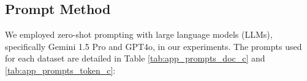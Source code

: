 \documentclass[11pt]{article}
\begin{document}


\subsection{Prompt Method}
\label{sec:prompt}
We employed zero-shot prompting with large language models (LLMs), specifically Gemini 1.5 Pro and GPT4o, in our experiments. The prompts used for each dataset are detailed in Table \ref{tab:app_prompts_doc_c} and \ref{tab:app_prompts_token_c}:
\end{document}
